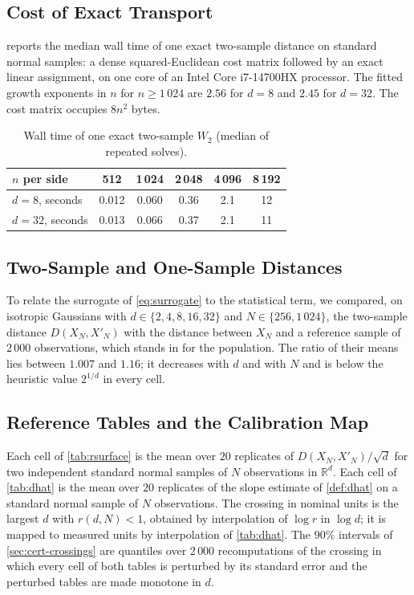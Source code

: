 \documentclass[twoside,11pt]{article}
\theoremstyle{plain}
\theoremstyle{definition}
\theoremstyle{remark}
\newcommand{\Wtwo}{\ensuremath{W_2}}
\newcommand{\R}{\ensuremath{\mathbb{R}}}
\begin{document}
\subsection{Cost of Exact Transport}\label{app:details-cost}

 reports the median wall time of one exact two-sample
distance on standard normal samples: a dense squared-Euclidean cost matrix
followed by an exact linear assignment, on one core of an Intel Core i7-14700HX
processor. The fitted growth exponents in $n$ for $n \geq 1\,024$
are $2.56$ for $d = 8$ and $2.45$ for $d = 32$. The cost matrix occupies
$8n^{2}$ bytes.

\begin{table}[htbp]
\centering
\small
\begin{tabular}{lccccc}
\toprule
$n$ per side & 512 & 1\,024 & 2\,048 & 4\,096 & 8\,192 \\
\midrule
$d = 8$, seconds & 0.012 & 0.060 & 0.36 & 2.1 & 12 \\
$d = 32$, seconds & 0.013 & 0.066 & 0.37 & 2.1 & 11 \\
\bottomrule
\end{tabular}
\caption{Wall time of one exact two-sample $\Wtwo$ (median of repeated
solves).}\label{tab:cost}
\end{table}

\subsection{Two-Sample and One-Sample Distances}\label{app:details-two-sample}

To relate the surrogate of \cref{eq:surrogate} to the statistical term, we
compared, on isotropic Gaussians with $d \in \{2, 4, 8, 16, 32\}$ and
$N \in \{256, 1\,024\}$, the two-sample distance $D(X_N, X'_N)$ with the
distance between $X_N$ and a reference sample of $2\,000$ observations, which
stands in for the population. The ratio of their means lies between $1.007$
and $1.16$; it decreases with $d$ and with $N$ and is below the heuristic
value $2^{1/d}$ in every cell.

\subsection{Reference Tables and the Calibration Map}\label{app:details-tables}

Each cell of \cref{tab:rsurface} is the mean over $20$ replicates of
$D(X_N, X'_N)/\sqrt{d}$ for two independent standard normal samples of
$N$ observations in $\R^d$. Each cell of \cref{tab:dhat} is the mean over
$20$ replicates of the slope estimate of \cref{def:dhat} on a standard normal
sample of $N$ observations. The crossing in nominal units is the largest
$d$ with $r(d, N) < 1$, obtained by interpolation of $\log r$ in $\log d$;
it is mapped to measured units by interpolation of \cref{tab:dhat}. The
$90\%$ intervals of \cref{sec:cert-crossings} are quantiles over $2\,000$
recomputations of the crossing in which every cell of both tables is
perturbed by its standard error and the perturbed tables are made monotone
in $d$.
\end{document}
